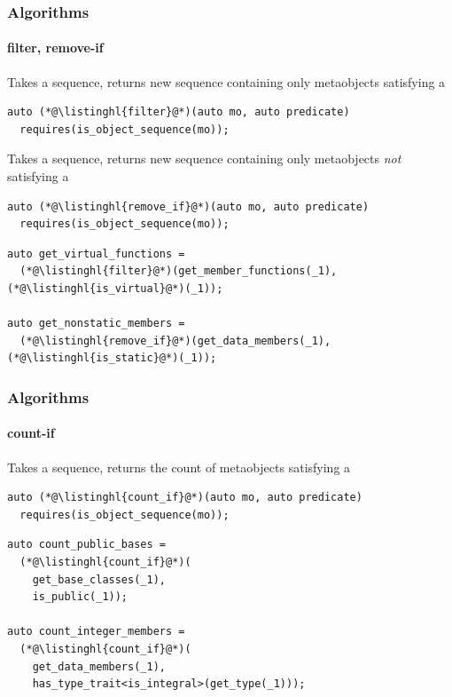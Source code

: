 \documentclass[compress,table,xcolor=table]{beamer}
\begin{document}
\begin{frame}[fragile]
  \frametitle{Algorithms}
  \framesubtitle{filter, remove-if}
  Takes a sequence, returns new sequence containing only metaobjects
  satisfying a 
  \begin{lstlisting}[language=c++2x]
auto (*@\listinghl{filter}@*)(auto mo, auto predicate)
  requires(is_object_sequence(mo));
  \end{lstlisting}
  \vfill
  Takes a sequence, returns new sequence containing only metaobjects
  {\em not} satisfying a 
  \begin{lstlisting}[language=c++2x]
auto (*@\listinghl{remove_if}@*)(auto mo, auto predicate)
  requires(is_object_sequence(mo));
  \end{lstlisting}
  \vfill
  \begin{lstlisting}[language=c++2x,basicstyle=\footnotesize\ttfamily]
auto get_virtual_functions =
  (*@\listinghl{filter}@*)(get_member_functions(_1), (*@\listinghl{is_virtual}@*)(_1));

auto get_nonstatic_members =
  (*@\listinghl{remove_if}@*)(get_data_members(_1), (*@\listinghl{is_static}@*)(_1));
  \end{lstlisting}
\end{frame}
\begin{frame}[fragile]
  \frametitle{Algorithms}
  \framesubtitle{count-if}
  Takes a sequence, returns the count of metaobjects satisfying
  a 
  \begin{lstlisting}[language=c++2x]
auto (*@\listinghl{count_if}@*)(auto mo, auto predicate)
  requires(is_object_sequence(mo));
  \end{lstlisting}
  \vfill
  \begin{lstlisting}[language=c++2x,basicstyle=\small\ttfamily]
auto count_public_bases =
  (*@\listinghl{count_if}@*)(
    get_base_classes(_1),
    is_public(_1));

auto count_integer_members =
  (*@\listinghl{count_if}@*)(
    get_data_members(_1),
    has_type_trait<is_integral>(get_type(_1)));
  \end{lstlisting}
\end{frame}
\end{document}

